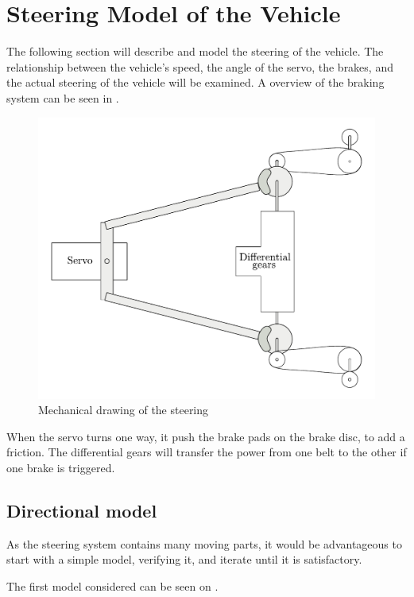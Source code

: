 \section{Steering Model of the Vehicle}\label{sec:SteeringModel}
The following section will describe and model the steering of the vehicle. The relationship between the vehicle's speed, the angle of the servo, the brakes, and the actual steering of the vehicle will be examined. A overview of the braking system can be seen in .

 \begin{figure}[H]
 	\centering
 	\includegraphics[scale=0.6]{figures/steeringMechanical.pdf}
 	\caption{Mechanical drawing of the steering}
 	\label{steeringMechanical}
 \end{figure}

When the servo turns one way, it push the brake pads on the brake disc, to add a friction. The differential gears will transfer the power from one belt to the other if one brake is triggered.

\subsection{Directional model}
As the steering system contains many moving parts, it would be advantageous to start with a simple model, verifying it, and iterate until it is satisfactory. 

The first model considered can be seen on .

